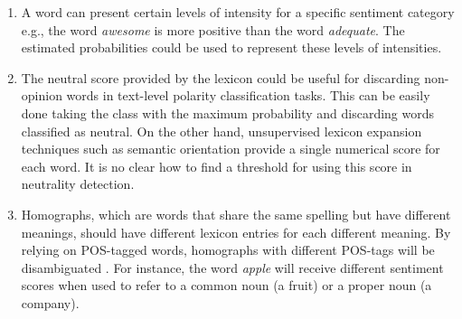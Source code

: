 \documentclass{sig-alternate}
\begin{document}
\begin{enumerate}
\item A word can present certain levels of intensity \cite{ThelwallBP12} for a specific sentiment category e.g., the word \emph{awesome} is more positive than the word \emph{adequate}. The estimated probabilities could be used to represent these levels of intensities.

\item  The neutral score provided by the lexicon could be useful for discarding non-opinion words in text-level polarity classification tasks. This can be easily done  taking the class with the maximum probability and discarding words classified as neutral. On the other hand, unsupervised lexicon expansion techniques such as semantic orientation \cite{Turney2002} provide a single numerical score for each word. It is no clear how to find a threshold for using this score in neutrality detection. 

\item   Homographs, which are  words that share the same spelling but have different meanings, should  have different lexicon entries for each different meaning. By relying on POS-tagged words, homographs with different POS-tags will be disambiguated \cite{wilks1998grammar}. For instance, the word \emph{apple}  will receive different sentiment scores when used to refer to a common noun (a fruit) or a proper noun (a company). 

\end{enumerate}
\end{document}
